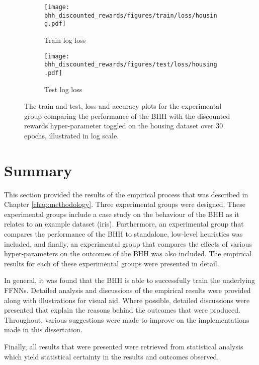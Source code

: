 \begin{figure}[htbp]
      \begin{subfigure}{0.5\textwidth}
            \centering
            \texttt{[image: bhh\_discounted\_rewards/figures/train/loss/housing.pdf]}
            \caption{Train log loss}
            \label{fig:results:discounted_rewards:figures:loss:train:housing}
      \end{subfigure}
      \begin{subfigure}{0.5\textwidth}
            \centering
            \texttt{[image: bhh\_discounted\_rewards/figures/test/loss/housing.pdf]}
            \caption{Test log loss}
            \label{fig:results:discounted_rewards:figures:loss:test:housing}
      \end{subfigure}
      \par\bigskip
      \caption{The train and test, loss and accuracy plots for the experimental group comparing the performance of the \acs{BHH} with the discounted rewards hyper-parameter toggled on the housing dataset over 30 epochs, illustrated in log scale.}
      \label{fig:results:discounted_rewards:figures:housing}
\end{figure}

\section{Summary}\label{sec:results:summary}

This section provided the results of the empirical process that was described in Chapter \ref{chap:methodology}. Three experimental groups were designed. These experimental groups include a case study on the behaviour of the \acs{BHH} as it relates to an example dataset (iris). Furthermore, an experimental group that compares the performance of the \acs{BHH} to standalone, low-level heuristics was included, and finally, an experimental group that compares the effects of various hyper-parameters on the outcomes of the \acs{BHH} was also included. The empirical results for each of these experimental groups were presented in detail.

In general, it was found that the \acs{BHH} is able to successfully train the underlying \acp{FFNN}. Detailed analysis and discussions of the empirical results were provided along with illustrations for visual aid. Where possible, detailed discussions were presented that explain the reasons behind the outcomes that were produced. Throughout, various suggestions were made to improve on the implementations made in this dissertation.

Finally, all results that were presented were retrieved from statistical analysis which yield statistical certainty in the results and outcomes observed.